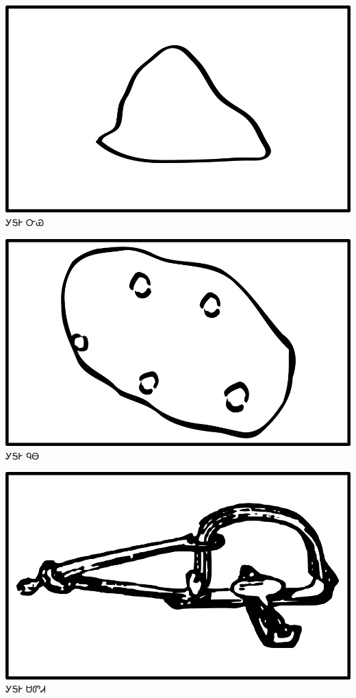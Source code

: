\documentclass[avery5371]{flashcards}%
\begin{document}
    \begin{flashcard}{
        \includegraphics[width=0.95\columnwidth,height=.51\columnwidth,keepaspectratio]{../artwork/objects-neutral/nvya}
    }
        \Huge ᎩᎦᎨ ᏅᏯ
    \end{flashcard}

    \begin{flashcard}{
        \includegraphics[width=0.95\columnwidth,height=.51\columnwidth,keepaspectratio]{../artwork/objects-neutral/nuna}
    }
        \Huge ᎩᎦᎨ ᏄᎾ
    \end{flashcard}

    \begin{flashcard}{
        \includegraphics[width=0.95\columnwidth,height=.51\columnwidth,keepaspectratio]{../artwork/objects-neutral/sadvdi}
    }
        \Huge ᎩᎦᎨ ᏌᏛᏗ
    \end{flashcard}
\end{document}
